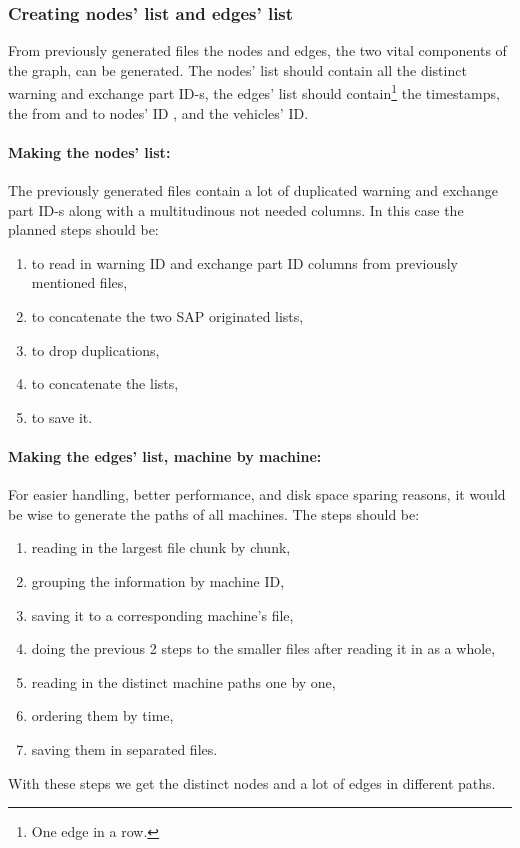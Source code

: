 		\subsubsection{Creating nodes' list and edges' list}
		From previously generated files the nodes and edges, the two vital components of the graph, can be generated. The nodes' list should contain all the distinct warning and exchange part ID-s, the edges' list should contain\footnote{One edge in a row.} the timestamps, the from and to nodes' ID , and the vehicles' ID.
		\paragraph{Making the nodes' list:}
		The previously generated files contain a lot of duplicated warning and exchange part ID-s along with a multitudinous not needed columns.
		In this case the planned steps should be:
		\begin{enumerate}
			\item{to read in warning ID and exchange part ID columns from previously mentioned files,} 
			\item{to concatenate the two SAP originated lists,}
			\item{to drop duplications,}
			\item{to concatenate the lists,}
			\item{to save it.}
		 \end{enumerate}
		\paragraph{Making the edges' list, machine by machine:}
		For easier handling, better performance, and disk space sparing reasons, it would be wise to generate the paths of all machines.
		The steps should be:
		\begin{enumerate}
			\item{reading in the largest file chunk by chunk,} 
			\item{grouping the information by machine ID,}
			\item{saving it to a corresponding machine's file,}
			\item{doing the previous 2 steps to the smaller files after reading it in as a whole,}
			\item{reading in the distinct machine paths one by one,}
			\item{ordering them by time,}
			\item{saving them in separated files.}
		 \end{enumerate}
		With these steps we get the distinct nodes and a lot of edges in different paths.

